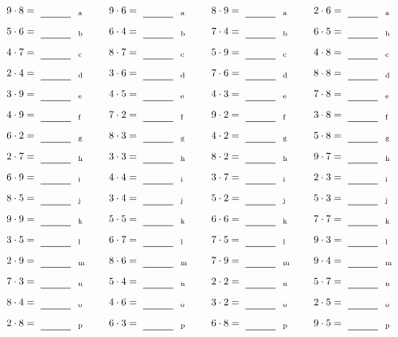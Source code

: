 \documentclass
[
  draft    = true,
  fontsize = 11pt,
  parskip  = half-
]
{scrartcl}
\begin{document}
\par\vfill\par
\begin{align*}
    \pline{9\cdot8}&=\rline{a}
  & \pline{9\cdot6}&=\rline{a}
  & \pline{8\cdot9}&=\rline{a}
  & \pline{2\cdot6}&=\rline{a} \\[1ex]
    \pline{5\cdot6}&=\rline{b}
  & \pline{6\cdot4}&=\rline{b}
  & \pline{7\cdot4}&=\rline{b}
  & \pline{6\cdot5}&=\rline{b} \\[1ex]
    \pline{4\cdot7}&=\rline{c}
  & \pline{8\cdot7}&=\rline{c}
  & \pline{5\cdot9}&=\rline{c}
  & \pline{4\cdot8}&=\rline{c} \\[1ex]
    \pline{2\cdot4}&=\rline{d}
  & \pline{3\cdot6}&=\rline{d}
  & \pline{7\cdot6}&=\rline{d}
  & \pline{8\cdot8}&=\rline{d} \\[1ex]
    \pline{3\cdot9}&=\rline{e}
  & \pline{4\cdot5}&=\rline{e}
  & \pline{4\cdot3}&=\rline{e}
  & \pline{7\cdot8}&=\rline{e} \\[1ex]
    \pline{4\cdot9}&=\rline{f}
  & \pline{7\cdot2}&=\rline{f}
  & \pline{9\cdot2}&=\rline{f}
  & \pline{3\cdot8}&=\rline{f} \\[1ex]
    \pline{6\cdot2}&=\rline{g}
  & \pline{8\cdot3}&=\rline{g}
  & \pline{4\cdot2}&=\rline{g}
  & \pline{5\cdot8}&=\rline{g} \\[1ex]
    \pline{2\cdot7}&=\rline{h}
  & \pline{3\cdot3}&=\rline{h}
  & \pline{8\cdot2}&=\rline{h}
  & \pline{9\cdot7}&=\rline{h} \\[1ex]
    \pline{6\cdot9}&=\rline{i}
  & \pline{4\cdot4}&=\rline{i}
  & \pline{3\cdot7}&=\rline{i}
  & \pline{2\cdot3}&=\rline{i} \\[1ex]
    \pline{8\cdot5}&=\rline{j}
  & \pline{3\cdot4}&=\rline{j}
  & \pline{5\cdot2}&=\rline{j}
  & \pline{5\cdot3}&=\rline{j} \\[1ex]
    \pline{9\cdot9}&=\rline{k}
  & \pline{5\cdot5}&=\rline{k}
  & \pline{6\cdot6}&=\rline{k}
  & \pline{7\cdot7}&=\rline{k} \\[1ex]
    \pline{3\cdot5}&=\rline{l}
  & \pline{6\cdot7}&=\rline{l}
  & \pline{7\cdot5}&=\rline{l}
  & \pline{9\cdot3}&=\rline{l} \\[1ex]
    \pline{2\cdot9}&=\rline{m}
  & \pline{8\cdot6}&=\rline{m}
  & \pline{7\cdot9}&=\rline{m}
  & \pline{9\cdot4}&=\rline{m} \\[1ex]
    \pline{7\cdot3}&=\rline{n}
  & \pline{5\cdot4}&=\rline{n}
  & \pline{2\cdot2}&=\rline{n}
  & \pline{5\cdot7}&=\rline{n} \\[1ex]
    \pline{8\cdot4}&=\rline{o}
  & \pline{4\cdot6}&=\rline{o}
  & \pline{3\cdot2}&=\rline{o}
  & \pline{2\cdot5}&=\rline{o} \\[1ex]
    \pline{2\cdot8}&=\rline{p}
  & \pline{6\cdot3}&=\rline{p}
  & \pline{6\cdot8}&=\rline{p}
  & \pline{9\cdot5}&=\rline{p}
\end{align*}
\end{document}

